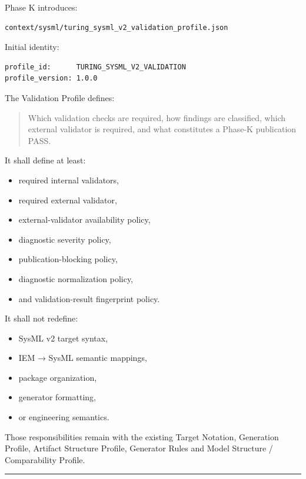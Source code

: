 Phase K introduces:

\begin{verbatim}
context/sysml/turing_sysml_v2_validation_profile.json
\end{verbatim}

Initial identity:

\begin{verbatim}
profile_id:      TURING_SYSML_V2_VALIDATION
profile_version: 1.0.0
\end{verbatim}

The Validation Profile defines:

\begin{quote}
Which validation checks are required, how findings are classified, which external validator is required, and what constitutes a Phase-K publication PASS.
\end{quote}

It shall define at least:

\begin{itemize}
\tightlist
\item
  required internal validators,
\item
  required external validator,
\item
  external-validator availability policy,
\item
  diagnostic severity policy,
\item
  publication-blocking policy,
\item
  diagnostic normalization policy,
\item
  and validation-result fingerprint policy.
\end{itemize}

It shall not redefine:

\begin{itemize}
\tightlist
\item
  SysML v2 target syntax,
\item
  IEM → SysML semantic mappings,
\item
  package organization,
\item
  generator formatting,
\item
  or engineering semantics.
\end{itemize}

Those responsibilities remain with the existing Target Notation, Generation Profile, Artifact Structure Profile, Generator Rules and Model Structure / Comparability Profile.

\begin{center}\rule{0.5\linewidth}{0.5pt}\end{center}

